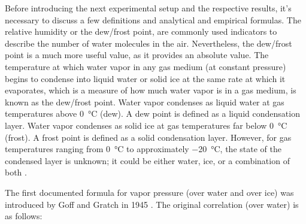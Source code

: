 Before introducing the next experimental setup and the respective results, it's necessary to discuss a few definitions and analytical and empirical formulas. The relative humidity or the dew/frost point, are commonly used indicators to describe the number of water molecules in the air. Nevertheless, the dew/frost point is a much more useful value, as it provides an absolute value. The temperature at which water vapor in any gas medium (at constant pressure) begins to condense into liquid water or solid ice at the same rate at which it evaporates, which is a measure of how much water vapor is in a gas medium, is known as the dew/frost point. Water vapor condenses as liquid water at gas temperatures above \SI{0}{\celsius} (dew). A dew point is defined as a liquid condensation layer. Water vapor condenses as solid ice at gas temperatures far below \SI{0}{\celsius} (frost). A frost point is defined as a solid condensation layer. However, for gas temperatures ranging from \SI{0}{\celsius} to approximately \SI{-20}{\celsius}, the state of the condensed layer is unknown; it could be either water, ice, or a combination of both \cite{nie_dewpoint}. 


The first documented formula for vapor pressure (over water and over ice) was introduced by Goff and Gratch in 1945 \cite{goff_gratch}. The original correlation (over water) is as follows:

